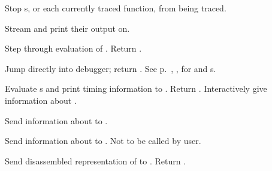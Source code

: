 \begin{LIST}{1cm}
  {
  Stop s, or each currently traced function, from being
  traced. 
  }

  {
  Stream  and  print their output on.
  }

  {
  Step through evaluation of . Return . 
  }

  {
  Jump directly into debugger; return \retval{\NIL}.
  See p.\ \pageref{section:Format}, , for 
  and s. 
  }

  {
  Evaluate s and print timing information to
  . Return . 
  }
  {
    Interactively give information about .
  }

  {
  Send information about  to .
  }

  {
  Send information about  to . Not to be
  called by user.
  }

  {
  Send disassembled representation of  to
  . Return \retval{\NIL}.
  }

\end{LIST}


